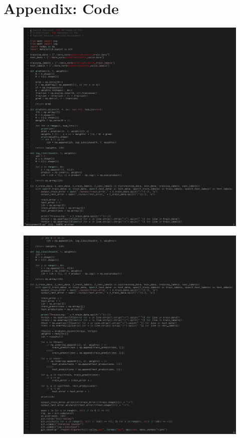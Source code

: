 \documentclass[UTF8]{article}
\begin{document}
\section{Appendix: Code}
\begin{figure}[H]
    \centering
    \includegraphics[scale=0.65]{./figures/code1.png}
\end{figure}
\begin{figure}[H]
    \centering
    \includegraphics[scale=0.65]{./figures/code2.png}
\end{figure}
\end{document}
